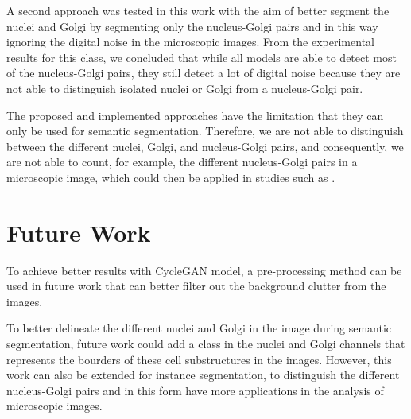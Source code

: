 A second approach was tested in this work with the aim of better segment the nuclei and Golgi by segmenting only the nucleus-Golgi pairs and in this way ignoring the digital noise in the microscopic images. From the experimental results for this class, we concluded that while all models are able to detect most of the nucleus-Golgi pairs, they still detect a lot of digital noise because they are not able to distinguish isolated nuclei or Golgi from a nucleus-Golgi pair.

The proposed and implemented approaches have the limitation that they can only be used for semantic segmentation. Therefore, we are not able to distinguish between the different nuclei, Golgi, and nucleus-Golgi pairs, and consequently, we are not able to count, for example, the different nucleus-Golgi pairs in a microscopic image, which could then be applied in studies such as \cite{nuclei&golgi}.

\section{Future Work}

To achieve better results with CycleGAN model, a pre-processing method can be used in future work that can better filter out the background clutter from the images.

To better delineate the different nuclei and Golgi in the image during semantic segmentation, future work could add a class in the nuclei and Golgi channels that represents the bourders of these cell substructures in the images. However, this work can also be extended for instance segmentation, to distinguish the different nucleus-Golgi pairs and in this form have more applications in the analysis of microscopic images.

